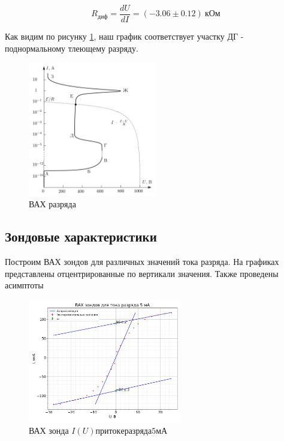 \documentclass[a4paper, 12pt]{article}
\begin{document}
            $$
                R_{диф} = \frac{dU}{dI} = (-3.06 \pm 0.12)~кОм
            $$

            Как видим по рисунку \ref{img:vah_plazma_labnik}, наш график соответствует участку ДГ - поднормальному тлеющему разряду.

            \begin{figure}[!ht]
                \centering
                \includegraphics[width=0.5\textwidth]{img/5.png}
                \caption{ВАХ разряда}
                \label{img:vah_plazma_labnik}
            \end{figure}

        \subsection{Зондовые характеристики}

            Построим ВАХ зондов для различных значений тока разряда. На графиках представлены отцентрированные по вертикали значения. Также проведены асимптоты

            \begin{figure}[!ht]
                \centering
                \includegraphics[width=0.6\textwidth]{img/vah_zond_5ma.png}
                \caption{ВАХ зонда $I(U) при токе разряда 5 мА$}
                \label{plot:vah_zond_5ma}
            \end{figure}
\end{document}
